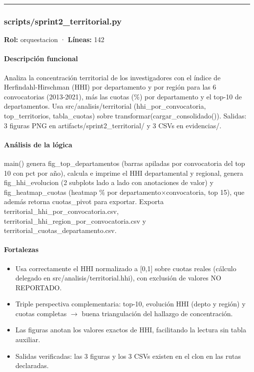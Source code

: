 \medskip
\hrule

\subsubsection{scripts/sprint2\_territorial.py}
\textbf{Rol:} orquestacion · \textbf{Líneas:} 142

\paragraph{Descripción funcional}
Analiza la concentración territorial de los investigadores con el índice de Herfindahl-Hirschman (HHI) por departamento y por región para las 6 convocatorias (2013-2021), más las cuotas (\%) por departamento y el top-10 de departamentos. Usa src/analisis/territorial (hhi\_por\_convocatoria, top\_territorios, tabla\_cuotas) sobre transformar(cargar\_consolidado()). Salidas: 3 figuras PNG en artifacts/sprint2\_territorial/ y 3 CSVs en evidencias/.

\paragraph{Análisis de la lógica}
main() genera fig\_top\_departamentos (barras apiladas por convocatoria del top 10 con pct por año), calcula e imprime el HHI departamental y regional, genera fig\_hhi\_evolucion (2 subplots lado a lado con anotaciones de valor) y fig\_heatmap\_cuotas (heatmap \% por departamento$\times$convocatoria, top 15), que además retorna cuotas\_pivot para exportar. Exporta territorial\_hhi\_por\_convocatoria.csv, territorial\_hhi\_region\_por\_convocatoria.csv y territorial\_cuotas\_departamento.csv.

\paragraph{Fortalezas}
\begin{itemize}
  \item Usa correctamente el HHI normalizado a [0,1] sobre cuotas reales (cálculo delegado en src/analisis/territorial.hhi), con exclusión de valores NO REPORTADO.
  \item Triple perspectiva complementaria: top-10, evolución HHI (depto y región) y cuotas completas $\rightarrow$ buena triangulación del hallazgo de concentración.
  \item Las figuras anotan los valores exactos de HHI, facilitando la lectura sin tabla auxiliar.
  \item Salidas verificadas: las 3 figuras y los 3 CSVs existen en el clon en las rutas declaradas.
\end{itemize}

